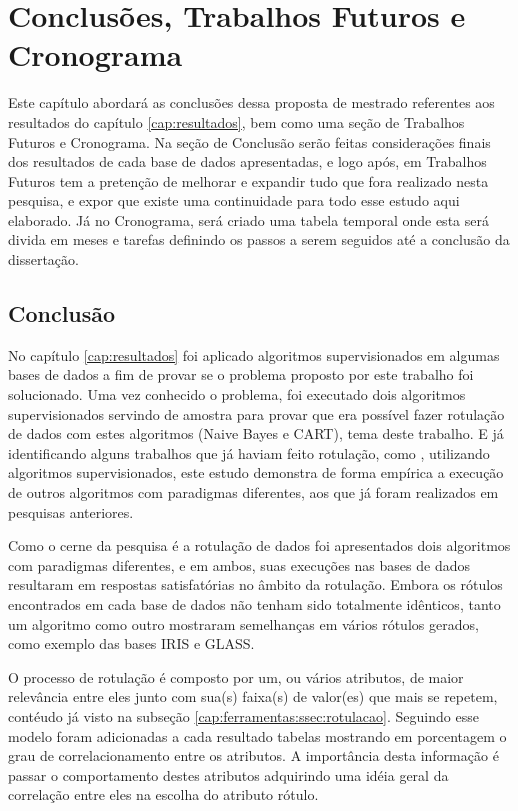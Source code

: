 \chapter{Conclusões, Trabalhos Futuros e Cronograma}\label{cap:conclusao} 

Este capítulo abordará as conclusões dessa  proposta de mestrado referentes aos resultados do capítulo \ref{cap:resultados},  bem como uma seção de Trabalhos Futuros e  Cronograma. Na seção de Conclusão serão feitas considerações finais dos resultados de cada base de dados apresentadas, e logo após, em Trabalhos Futuros tem a pretenção de melhorar e expandir tudo que fora realizado  nesta pesquisa, e expor que existe uma continuidade para todo esse estudo aqui elaborado. Já no Cronograma, será criado uma tabela temporal onde esta será divida em meses e tarefas definindo os passos a serem seguidos até a conclusão da dissertação.

\section{Conclusão}\label{cond}
No capítulo \ref{cap:resultados} foi aplicado algoritmos supervisionados em algumas bases de dados a fim de provar se o problema proposto por este  trabalho foi solucionado. Uma vez conhecido o problema, foi executado dois algoritmos supervisionados servindo de amostra para provar que era possível fazer rotulação de dados com estes algoritmos (Naive Bayes e CART), tema deste trabalho. E já identificando alguns trabalhos que já haviam feito rotulação, como , utilizando algoritmos supervisionados, este estudo demonstra de forma empírica a execução de outros algoritmos com paradigmas diferentes, aos que já foram realizados em pesquisas anteriores. 

Como o cerne da pesquisa é a rotulação de dados foi apresentados dois algoritmos com paradigmas diferentes, e em ambos, suas execuções nas bases de dados resultaram em respostas satisfatórias no âmbito da rotulação. Embora os rótulos encontrados  em cada base de dados não tenham sido totalmente idênticos, tanto um algoritmo como outro mostraram semelhanças em vários rótulos gerados, como exemplo das bases IRIS e GLASS.

O processo de rotulação é composto por um, ou vários atributos, de maior relevância entre eles junto com sua(s) faixa(s) de valor(es) que mais se repetem, contéudo já visto na subseção \ref{cap:ferramentas:ssec:rotulacao}. Seguindo esse modelo foram adicionadas a cada resultado tabelas mostrando em porcentagem o grau de correlacionamento entre os atributos. A importância desta informação é passar o comportamento destes atributos adquirindo uma idéia geral da correlação entre eles na escolha do atributo rótulo.

